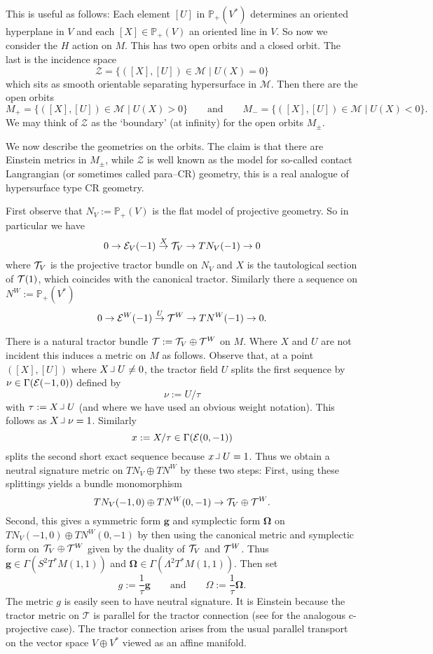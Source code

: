 This is useful as follows: Each element $[U]$ in
$\mathbb{P}_+(V^*)$ determines an oriented  hyperplane in $V$ and each $[X]\in
\mathbb{P}_+(V)$ an oriented line in $V$.  So now we consider the $H$
action on $M$. This has two open orbits and a closed orbit. The last
is the incidence space 
$$
\mathcal{Z}=\{ ([X],[U])\in \mathcal{M} \mid U(X)=0 \} 
$$
which sits as smooth orientable separating hypersurface in $\mathcal{M}$. Then there are the open orbits
$$
M_+=\{ ([X],[U])\in \mathcal{M} \mid U(X)>0 \} \qquad \mbox{and} \qquad
M_-=\{ ([X],[U])\in \mathcal{M} \mid U(X)<0 \}.
$$
We may think of $\mathcal{Z}$ as the `boundary' (at infinity) for the open orbits $M_\pm$.

We now describe the geometries on the orbits. The claim is that there
are Einstein metrics in $M_\pm$, while $\mathcal{Z}$ is well known as
the model for so-called contact Langrangian (or sometimes called
para--CR) geometry, this is a real analogue of hypersurface type CR
geometry.

First observe that $N_V:=\mathbb{P}_+(V)$
is the flat model of projective
geometry. So in particular we have
$$
0\to \mathcal{E}_V(-1)\stackrel{X}{\to}\mathcal{T}_V\to TN_V(-1)\to 0
$$
where $\mathcal{T}_V$ is the projective tractor bundle on $N_V$ and $X$ is the
tautological section of $\mathcal{T}(1)$, which coincides with the canonical tractor.
Similarly there a sequence on
$N^W:= \mathbb{P}_+(V^*)$
\begin{equation}\label{useful}
0\to \mathcal{E}^W(-1)\stackrel{U}{\to}\mathcal{T}^W \to TN^W(-1)\to 0 .
\end{equation}

There is a natural tractor bundle $\mathcal{T}:=\mathcal{T}_V\oplus \mathcal{T}^W $ on $M$. 
Where $X$ and $U$ are not incident this induces a metric on $M$ as
follows. Observe that, at a point $([X],[U])$ where $X\hook U \neq 0$, the  tractor field  $U$ splits the first sequence by $\nu\in \Gamma (\mathcal{E}(-1,0))$ defined by
$$
\nu:=U/\tau
$$
with $\tau:=X\hook U$ (and where we have used an obvious weight
notation). This follows as $X\hook \nu=1$. Similarly
$$
x:=X/\tau \in \Gamma (\mathcal{E}(0,-1))
$$
splits the second short exact sequence because $x \hook U=1$. Thus we
obtain a neutral signature metric on $TN_V\oplus TN^W$ by these
two steps: First, using  these splittings yields a bundle
monomorphism
$$
TN_V(-1,0)\oplus TN^W(0,-1) \to \mathcal{T}_V\oplus \mathcal{T}^W .
$$ Second, this gives a symmetric form $\boldsymbol{g}$ and symplectic form
$\boldsymbol{\Omega}$ on $TN_V(-1,0)\oplus TN^W(0,-1)$ by then using
the canonical metric and symplectic form on $\mathcal{T}_V\oplus \mathcal{T}^W $ given
by the duality of $\mathcal{T}_V$ and $ \mathcal{T}^W$. Thus $\boldsymbol{g}\in \Gamma
(S^2T^*M(1,1))$ and $\boldsymbol{\Omega}\in \Gamma
(\Lambda^2T^*M(1,1))$. Then set
$$ g:=\frac{1}{\tau}\boldsymbol{g} \qquad \mbox{and} \qquad  \Omega:=\frac{1}{\tau}\boldsymbol{\Omega}.
$$
The metric $g$ is easily seen to have neutral signature.  It is
Einstein because the tractor metric on $\mathcal{T}$ is parallel for the
tractor connection (see \cite{CGH-duke} for the analogous c-projective
case). The tractor connection arises from the usual parallel transport on the
vector space $V\oplus V^*$ viewed as an affine manifold.

